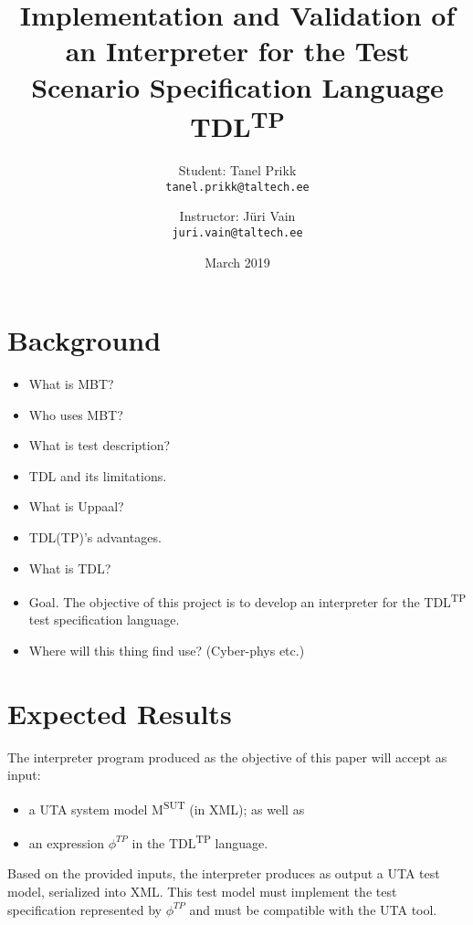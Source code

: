 \documentclass[12pt,oneside,a4paper,draft,notitlepage]{article}
\title{
	Implementation and Validation of an Interpreter
	for the Test Scenario Specification Language TDL\textsuperscript{TP}\\
}
\author{
	Student: Tanel Prikk\\
	\texttt{tanel.prikk@taltech.ee}
	\and
	Instructor: Jüri Vain\\
	\texttt{juri.vain@taltech.ee}
}
\date{March 2019}
\begin{document}
	\maketitle
	\section*{Background}
	\begin{itemize}
		\item What is MBT?
		\item Who uses MBT?
		\item What is test description?
		\item TDL and its limitations.
		\item What is Uppaal?
		\item TDL(TP)'s advantages.
		\item What is TDL?
		\item Goal. The objective of this project is to develop an interpreter for the TDL\textsuperscript{TP} test specification language. 
		\item Where will this thing find use? (Cyber-phys etc.)
	\end{itemize}

	\section*{Expected Results}
	\par The interpreter program produced as the objective of this paper will accept as input:
	\begin{itemize}
		\item a UTA system model M\textsuperscript{SUT} (in XML); as well as
		\item an expression $\phi^{TP}$ in the TDL\textsuperscript{TP} language.
	\end{itemize}

	\par Based on the provided inputs, the interpreter produces as output a UTA test model, serialized into XML. This test model must implement the test specification represented by $\phi^{TP}$ and must be compatible with the UTA tool.

	\bigskip
\end{document}

